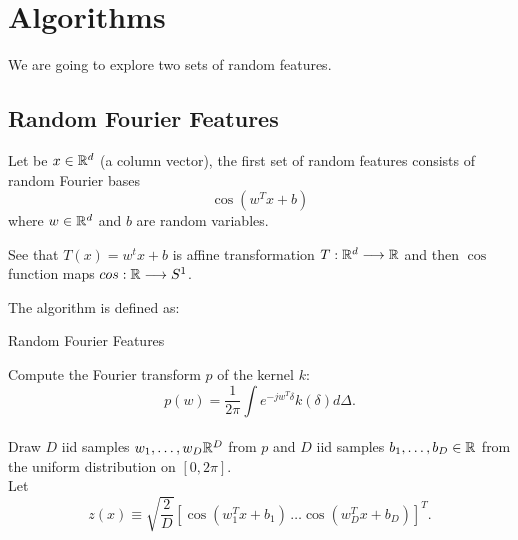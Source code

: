 \chapter{Algorithms}


We are going to explore two sets of random features. 

\section{Random Fourier Features}

Let be $x \in \mathbb{R}^d$  (a column vector), the first set of random features consists of random 
Fourier bases
\begin{equation}
    \cos(w^T x + b) 
\end{equation}
where $w \in \mathbb{R}^d$  and $b$ are random variables. 

See that $T(x) = w^t x +b$ is affine transformation
$T:\mathbb{R}^d \longrightarrow \mathbb{R}$  and then $\cos$ function maps
$cos: \mathbb{R}  \longrightarrow S^1$. 

The algorithm is defined as: 

\begin{algorithm}[hbt!]
    \caption{Random Fourier Features}\label{alg:two}

     Compute the Fourier transform $p$ of the kernel $k$: 
    \begin{equation}\label{eq:fourier_transformation}
        p(w) = \frac{1}{2 \pi}
        \int
        e^{-jw^T \delta}k(\delta) 
        d \Delta. 
     \end{equation}
        \\
     Draw $D$ iid samples 
     $w_1, \ldots, w_D \mathbb{R}^D$ from $p$ and
     $D$ iid samples $b_1, \ldots, b_D \in \mathbb{R}$
     from the uniform distribution on 
     $[0, 2\pi]$. 
     \\
     Let 
     \begin{equation}
        z(x)
        \equiv
        \sqrt{\frac{2}{D}}
        \left[ 
            \cos(w_1^T x + b_1) 
            \, 
            \ldots
            \cos(w_D^T x + b_D) 
            \right]^T. 
     \end{equation}
    \end{algorithm}


